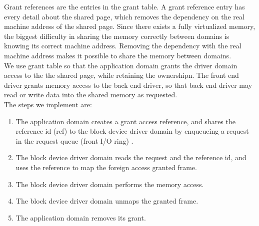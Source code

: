 Grant references are the entries in the grant table. A grant reference entry has every detail about the shared page, which removes the dependency on the real machine address of the shared page. Since there exists a fully virtualized memory, the biggest difficulty in sharing the memory correctly between domains is knowing its correct machine address. Removing the dependency with the real machine address makes it possible to share the memory between domains.\cite{Chisnall:2007:DGX:1407351, Barham:2003:XAV:945445.945462, granttable} 
\\
We use grant table so that the application domain grants the driver domain access to the the shared page, while retaining the ownershipn. The front end driver grants memory access to the back end driver, so that back end driver may read or write data into the shared memory as requested.
\\
The steps we implement are:
\begin{enumerate}
\item The application domain creates a grant access reference, and shares the reference id (ref) to the block device driver domain by enqueueing a request in the request queue (front I/O ring) .
\item The block device driver domain reads the request and the reference id, and uses the reference to map the foreign access granted frame.
\item The block device driver domain performs the memory access.
\item The block device driver domain unmaps the granted frame.
\item The application domain removes its grant.
\end{enumerate}

